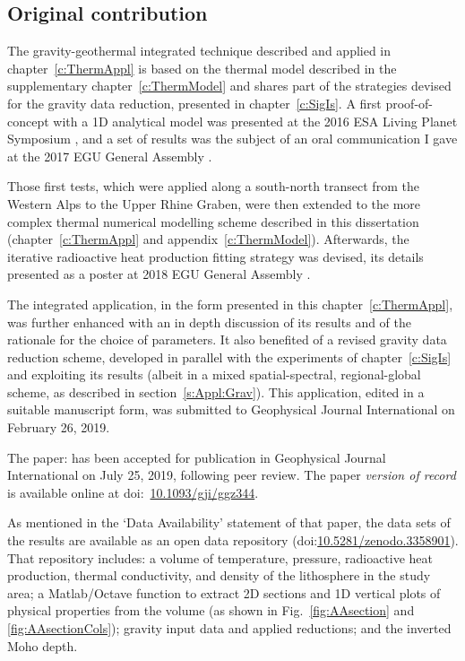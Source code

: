 \subsection*{Original contribution}
The gravity-geothermal integrated technique described and applied in chapter~\ref{c:ThermAppl} is based on the thermal model described in the supplementary chapter~\ref{c:ThermModel} and shares part of the strategies devised for the gravity data reduction, presented in chapter~\ref{c:SigIs}.
A first proof-of-concept with a 1D analytical model was presented at the 2016 ESA Living Planet Symposium \parencite{Pastorutti2016LPS}, and a set of results was the subject of an oral communication I gave at the 2017 EGU General Assembly \parencite{Pastorutti2017_EGUoral}.

Those first tests, which were applied along a south-north transect from the Western Alps to the Upper Rhine Graben, were then extended to the more complex thermal numerical modelling scheme described in this dissertation (chapter~\ref{c:ThermAppl} and appendix~\ref{c:ThermModel}).
Afterwards, the iterative radioactive heat production fitting strategy was devised, its details presented as a poster at 2018 EGU General Assembly \parencite{Pastorutti2018_EGUposter}.

The integrated application, in the form presented in this chapter~\ref{c:ThermAppl}, was further enhanced with an in depth discussion of its results and of the rationale for the choice of parameters.
It also benefited of a revised gravity data reduction scheme, developed in parallel with the experiments of chapter~\ref{c:SigIs} and exploiting its results (albeit in a mixed spatial-spectral, regional-global scheme, as described in section~\ref{s:Appl:Grav}).
This application, edited in a suitable manuscript form, was submitted to Geophysical Journal International on February 26, 2019.

The paper:  \parencite{Pastorutti2019} has been accepted for publication in Geophysical Journal International on July 25, 2019, following peer review.
The paper \textit{version of record} is available online at doi:~\href{https://doi.org/10.1093/gji/ggz344}{10.1093/gji/ggz344}.

As mentioned in the `Data Availability' statement of that paper, the data sets of the results are available as an open data repository (doi:\href{https://doi.org/10.5281/zenodo.3358901}{10.5281/zenodo.3358901}).
That repository includes: a volume of temperature, pressure, radioactive heat production, thermal conductivity, and density of the lithosphere in the study area; a Matlab/Octave function to extract 2D sections and 1D vertical plots of physical properties from the volume (as shown in Fig.~\ref{fig:AAsection} and \ref{fig:AAsectionCols}); gravity input data and applied reductions; and the inverted Moho depth.

